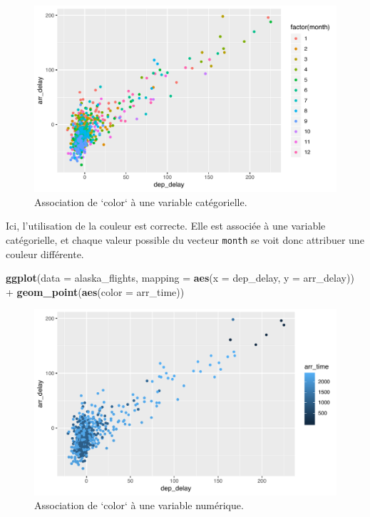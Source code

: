 \documentclass[
  a4paper,
]{article}
\newenvironment{Shaded}{\begin{snugshade}}{\end{snugshade}}
\newcommand{\DataTypeTok}[1]{\textcolor[rgb]{0.00,0.34,0.68}{#1}}
\newcommand{\KeywordTok}[1]{\textcolor[rgb]{0.12,0.11,0.11}{\textbf{#1}}}
\newcommand{\NormalTok}[1]{\textcolor[rgb]{0.12,0.11,0.11}{#1}}
\newcommand{\OperatorTok}[1]{\textcolor[rgb]{0.12,0.11,0.11}{#1}}
\newcommand{\StringTok}[1]{\textcolor[rgb]{0.75,0.01,0.01}{#1}}
\begin{document}
\begin{figure}[htpb]

{\centering \includegraphics[width=0.9\linewidth]{figure/varcolor-1} 

}

\caption{Association de `color` à une variable catégorielle.}\label{fig:varcolor}
\end{figure}

Ici, l'utilisation de la couleur est correcte. Elle est associée à une variable catégorielle, et chaque valeur possible du vecteur \texttt{month} se voit donc attribuer une couleur différente.

\begin{Shaded}
\begin{Highlighting}[]
\KeywordTok{ggplot}\NormalTok{(}\DataTypeTok{data =}\NormalTok{ alaska_flights, }\DataTypeTok{mapping =} \KeywordTok{aes}\NormalTok{(}\DataTypeTok{x =}\NormalTok{ dep_delay, }\DataTypeTok{y =}\NormalTok{ arr_delay)) }\OperatorTok{+}
\StringTok{  }\KeywordTok{geom_point}\NormalTok{(}\KeywordTok{aes}\NormalTok{(}\DataTypeTok{color =}\NormalTok{ arr_time))}
\end{Highlighting}
\end{Shaded}

\begin{figure}[htpb]

{\centering \includegraphics[width=0.9\linewidth]{figure/varcolor2-1} 

}

\caption{Association de `color` à une variable numérique.}\label{fig:varcolor2}
\end{figure}
\end{document}
